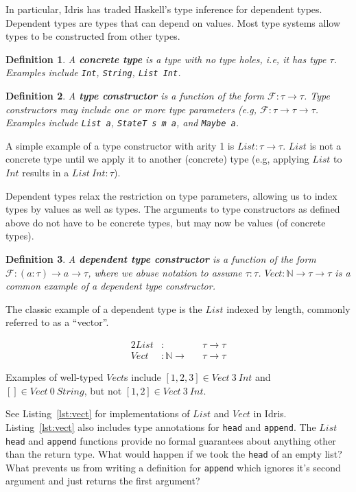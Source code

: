\documentclass[12pt]{article}
\newtheorem{defn}{Definition}[section]
\begin{document}
In particular, Idris has traded Haskell's type inference for dependent types.
Dependent types are types that can depend on values.
Most type systems allow types to be constructed from other types.

\begin{defn}
  A \textbf{concrete type} is a type with no type holes, i.e, it has type $\tau$. Examples include \texttt{Int}, \texttt{String}, \texttt{List Int}.
\end{defn}

\begin{defn}
  A \textbf{type constructor} is a function of the form
  $\mathcal{F} : \tau \rightarrow \tau$. Type constructors may include one or more type parameters (e.g, $\mathcal{F} : \tau \rightarrow \tau \rightarrow \tau$.
  Examples include \texttt{List a}, \texttt{StateT s m a}, and \texttt{Maybe a}.
\end{defn}

A simple example of a type constructor with arity 1 is $List : \tau \rightarrow \tau$.
$List$ is not a concrete type until we apply it to another (concrete) type (e.g, applying $List$ to $Int$ results in a $List\ Int : \tau$).

Dependent types relax the restriction on type parameters, allowing us to index types by values as well as types.
The arguments to type constructors as defined above do not have to be concrete types, but may now be values (of concrete types).

\begin{defn}
  A \textbf{dependent type constructor} is a function of the form
  $\mathcal{F} : (a : \tau) \rightarrow a \rightarrow \tau$, where we abuse notation to assume $\tau : \tau$.
  $Vect : \mathbb{N} \rightarrow \tau \rightarrow \tau$ is a common example of a dependent type constructor.
\end{defn}

The classic example of a dependent type is the $List$ indexed by length, commonly referred to as a ``vector''.

\begin{alignat*}{2}
  List &:                        &&\tau \rightarrow \tau \\
  Vect &: \mathbb{N} \rightarrow &&\tau \rightarrow \tau
\end{alignat*}


Examples of well-typed $Vect$s include $[1,2,3]\in Vect\ 3\ Int$ and $[]\in Vect\ 0\ String$, but not $[1,2]\in Vect\ 3\ Int$.

See Listing~\ref{lst:vect} for implementations of $List$ and $Vect$ in Idris.
Listing~\ref{lst:vect} also includes type annotations for \texttt{head} and \texttt{append}.
The $List$ \texttt{head} and \texttt{append} functions provide no formal guarantees about anything other than the return type.
What would happen if we took the \texttt{head} of an empty list?
What prevents us from writing a definition for \texttt{append} which ignores it's second argument and just returns the first argument?
\end{document}
